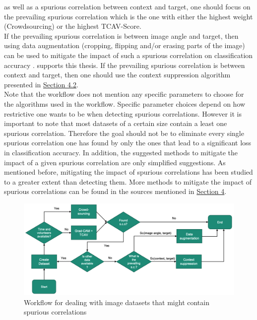 \documentclass{article}
\begin{document}
as well as a spurious correlation between context and target, one should focus on the prevailing spurious correlation which is the one with either
the highest weight (Crowdsourcing) or the highest TCAV-Score. \\
If the prevailing spurious correlation is between image angle and target, then using data augmentation (cropping, flipping and/or erasing parts of the image)
can be used to mitigate the impact of such a spurious correlation on classification accuracy \cite{Agarwal_2020_CVPR}.
supports this thesis. 
If the prevailing spurious correlation is between context and target, then one should use the context suppression algorithm presented in
\hyperref[sec:contextSuppr]{Section 4.2}. \\
Note that the workflow does not mention any specific parameters to choose for the algorithms used in the workflow. Specific parameter choices depend on how restrictive
one wants to be when detecting spurious correlations. However it is important to note that most datasets of a certain size contain a least one spurious correlation.
Therefore the goal should not be to eliminate every single spurious correlation one has found by only the ones that lead to a significant loss in
classification accuracy. In addition, the suggested methods to mitigate the impact of a given spurious correlation are only simplified suggestions.
As mentioned before, mitigating the impact of spurious correlations has been studied to a greater extent than detecting them. 
More methods to mitigate the impact of spurious correlations can be found in the sources mentioned in \hyperref[sec:mitigatingscs]{Section 4}.

\begin{figure}
    \centering
    \includegraphics[scale=0.30]{sc_workflow.png}
    \caption{Workflow for dealing with image datasets that might contain spurious correlations}
    \label{fig:workflow}
\end{figure}
\end{document}
